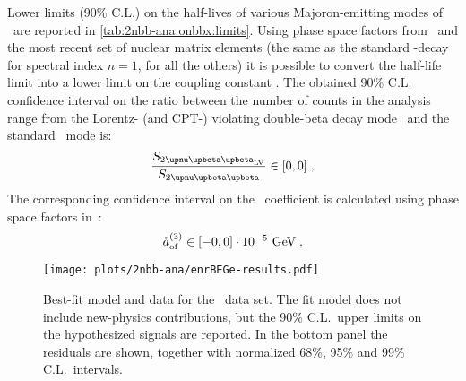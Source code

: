 Lower limits (90\% C.L.) on the half-lives of various Majoron-emitting modes of \onbb\ are
reported in \cref{tab:2nbb-ana:onbbx:limits}.
\newpar
Using phase space factors from~\cite{Kotila2015} and the most recent set of nuclear matrix
elements (the same as the standard \onbb-decay for spectral index $n=1$, \cite{Hirsch1995}
for all the others) it is possible to convert the half-life limit into a lower limit on
the coupling constant \ga.
\newpar
The obtained 90\% C.L. confidence interval on the ratio between the number of counts in
the analysis range from the Lorentz- (and CPT-) violating double-beta decay mode \nnbblv\
and the standard \nnbb\ mode is:
\[
  \frac{S_\nnbblvM}{S_\nnbbM} \in [0,0] \;,
\]
The corresponding confidence interval on the \aof\ coefficient is calculated using phase
space factors in~\cite{Nitescu2020}:
\[
  {\mathring{a}_\text{of}^{(3)}} \in [-0, 0] \cdot 10^{-5}~\text{GeV} \;.
\]

\begin{table}
  \centering
  \caption{%
    90\% C.L.~lower limits for Majoron-emitting \onbb\ modes contributing to the \nnbb\
    event distribution. Nuclear matrix elements for spectral index $n=1$ are the same as
    the standard \onbb, and have been therefore selected from the most recent nuclear
    calculations.  Matrix elements for the other decay modes have been taken
    from~\cite{Hirsch1995}.  Phase space factors have been taken from~\cite{Kotila2015}.
    \fillme{numbers}
  }\label{tab:2nbb-ana:onbbx:limits}
  
\end{table}

\begin{figure}
  \centering
  \texttt{[image: plots/2nbb-ana/enrBEGe-results.pdf]}
  \caption{%
    Best-fit model and data for the \enrBEGeII\ data set. The fit model does not include
    new-physics contributions, but the 90\% C.L.~upper limits on the
    hypothesized signals are reported. In the bottom panel the residuals are shown,
    together with normalized 68\%, 95\% and 99\% C.L.~intervals.
  }\label{fig:2nbb-ana:limits}
\end{figure}

\chapendgliph{}

